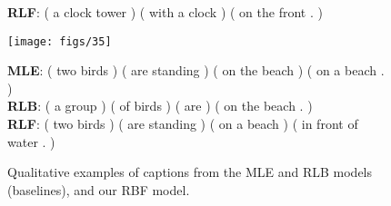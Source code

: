 \begin{figure}[t!]
\begin{minipage}{.33\textwidth}
        {\bf RLF}: ( a clock tower ) ( with a clock ) ( on the front . )\\
        \end{minipage}
        \hspace{4mm}
              \begin{minipage}{.13\textwidth}
      \vspace{3mm}
      \texttt{[image: figs/35]}
      \vspace{1mm}
    \end{minipage}
    \hspace{1mm}
    \begin{minipage}{.33\textwidth}
        {\bf MLE}: ( two birds ) ( are standing ) ( on the beach ) ( on a beach . )\\
        {\bf RLB}: ( a group ) ( of birds ) ( are ) ( on the beach . )\\
        {\bf RLF}: ( two birds ) ( are standing ) ( on a beach ) ( in front of water . )\\
         \end{minipage}
         \vspace{-5mm}
         \caption{\small Qualitative examples of captions from the MLE and RLB models (baselines), and our RBF model.}
         \label{fig:examples}
         \vspace{-2mm}
      \end{figure}


